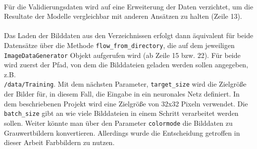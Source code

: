 \\
Für die Validierungsdaten wird auf eine Erweiterung der Daten verzichtet, um die Resultate der Modelle vergleichbar mit anderen Ansätzen zu halten (Zeile 13).\\
\\
Das Laden der Bilddaten aus den Verzeichnissen erfolgt dann äquivalent für beide Datensätze über die Methode \texttt{flow\_from\_directory}, die auf dem jeweiligen\\
\texttt{ImageDataGenerator} Objekt aufgerufen wird (ab Zeile 15 bzw. 22). Für beide wird zuerst der Pfad, von dem die Bilddateien geladen werden sollen angegeben, z.B. \\
\texttt{/data/Training}. Mit dem nächsten Parameter, \texttt{target\_size} wird die Zielgröße der Bilder für, in diesem Fall, die Eingabe in ein neuronales Netz definiert. In dem beschriebenen Projekt wird eine Zielgröße von 32x32 Pixeln verwendet. Die \texttt{batch\_size} gibt an wie viele Bilddateien in einem Schritt verarbeitet werden sollen. Weiter könnte man über den Parameter \texttt{colormode} die Bilddaten zu Grauwertbildern konvertieren. Allerdings wurde die Entscheidung getroffen in dieser Arbeit Farbbildern zu nutzen.

